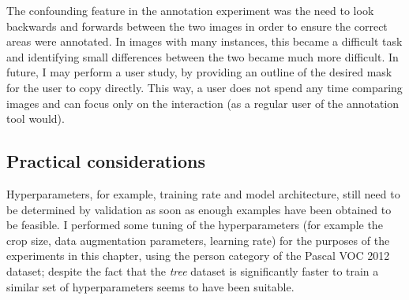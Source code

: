 \begin{table*}[!ht]
  \centering
    \caption{Statistics from annotating the set with polygons, lines and then by refining model predictions. Precision, recall and IOU are a comparison with the original validation set. Note figures in brackets are the original statistics of the unmodified predictions from the model}

\noindent{}

\label{tab:annotation_exp}
\end{table*}


The confounding feature in the annotation experiment was the need to look backwards and forwards between the two images in order to ensure the correct areas were annotated. In images with many instances, this became a difficult task and identifying small differences between the two became much more difficult. In future, I may perform a user study, by providing an outline of the desired mask for the user to copy directly. This way, a user does not spend any time comparing images and can focus only on the interaction (as a regular user of the annotation tool would).


\subsection{Practical considerations}

Hyperparameters, for example, training rate and model architecture, still need to be determined by validation as soon as enough examples have been obtained to be feasible. I performed some tuning of the hyperparameters (for example the crop size, data augmentation parameters, learning rate) for the purposes of the experiments in this chapter, using the person category of the Pascal \gls{VOC} 2012 dataset; despite the fact that the \emph{tree} dataset is significantly faster to train a similar set of hyperparameters seems to have been suitable.


